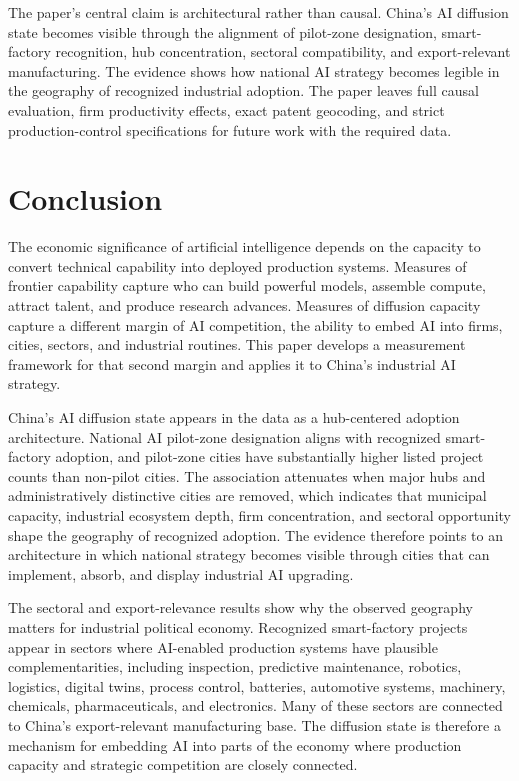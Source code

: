 \documentclass[12pt]{article}
\begin{document}
The paper's central claim is architectural rather than causal. China's AI diffusion state becomes visible through the alignment of pilot-zone designation, smart-factory recognition, hub concentration, sectoral compatibility, and export-relevant manufacturing. The evidence shows how national AI strategy becomes legible in the geography of recognized industrial adoption. The paper leaves full causal evaluation, firm productivity effects, exact patent geocoding, and strict production-control specifications for future work with the required data.

\section{Conclusion}
\label{sec:conclusion}

The economic significance of artificial intelligence depends on the capacity to convert technical capability into deployed production systems. Measures of frontier capability capture who can build powerful models, assemble compute, attract talent, and produce research advances. Measures of diffusion capacity capture a different margin of AI competition, the ability to embed AI into firms, cities, sectors, and industrial routines. This paper develops a measurement framework for that second margin and applies it to China's industrial AI strategy.

China's AI diffusion state appears in the data as a hub-centered adoption architecture. National AI pilot-zone designation aligns with recognized smart-factory adoption, and pilot-zone cities have substantially higher listed project counts than non-pilot cities. The association attenuates when major hubs and administratively distinctive cities are removed, which indicates that municipal capacity, industrial ecosystem depth, firm concentration, and sectoral opportunity shape the geography of recognized adoption. The evidence therefore points to an architecture in which national strategy becomes visible through cities that can implement, absorb, and display industrial AI upgrading.

The sectoral and export-relevance results show why the observed geography matters for industrial political economy. Recognized smart-factory projects appear in sectors where AI-enabled production systems have plausible complementarities, including inspection, predictive maintenance, robotics, logistics, digital twins, process control, batteries, automotive systems, machinery, chemicals, pharmaceuticals, and electronics. Many of these sectors are connected to China's export-relevant manufacturing base. The diffusion state is therefore a mechanism for embedding AI into parts of the economy where production capacity and strategic competition are closely connected.
\end{document}
